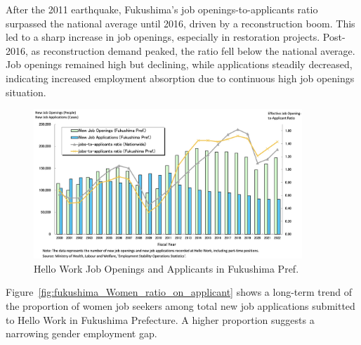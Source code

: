 \documentclass[a4paper,12pt]{article}
\begin{document}


After the 2011 earthquake, Fukushima's job openings-to-applicants ratio surpassed the national average until 2016, driven by a reconstruction boom. This led to a sharp increase in job openings, especially in restoration projects. Post-2016, as reconstruction demand peaked, the ratio fell below the national average. Job openings remained high but declining, while applications steadily decreased, indicating increased employment absorption due to continuous high job openings situation.


\begin{figure}[h!]
    \centering
    \includegraphics[width=0.9\textwidth]{New Job Openings.jpeg}  %
    \caption{Hello Work Job Openings and Applicants in Fukushima Pref.}
    \label{fig:new_job_openings}
\end{figure}



Figure~\ref{fig:fukushima_Women_ratio_on_applicant} shows a long-term trend of the proportion of women job seekers among total new job applications submitted to Hello Work in Fukushima Prefecture. A higher proportion suggests a narrowing gender employment gap. 
\end{document}
